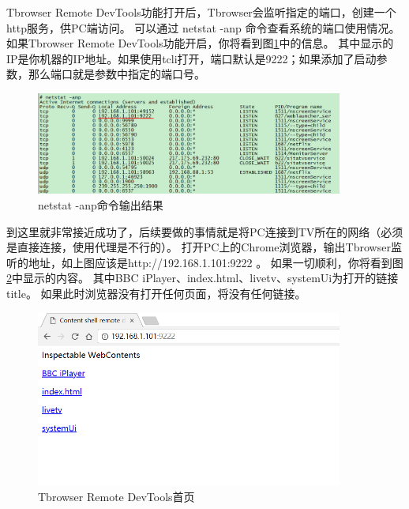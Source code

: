 Tbrowser Remote DevTools功能打开后，Tbrowser会监听指定的端口，创建一个http服务，供PC端访问。
可以通过 netstat -anp 命令查看系统的端口使用情况。
如果Tbrowser Remote DevTools功能开启，你将看到图\ref{fig:netstat_command}中的信息。
其中显示的IP是你机器的IP地址。如果使用tcli打开，端口默认是9222；如果添加了启动参数，那么端口就是参数中指定的端口号。
\begin{figure}[H] 
\centering 
\includegraphics[width=0.9\textwidth]{image/devtools_study/netstat.PNG} 
\caption{netstat -anp命令输出结果} \label{fig:netstat_command} 
\end{figure}

到这里就非常接近成功了，后续要做的事情就是将PC连接到TV所在的网络（必须是直接连接，使用代理是不行的）。
打开PC上的Chrome浏览器，输出Tbrowser监听的地址，如上图应该是http://192.168.1.101:9222 。
如果一切顺利，你将看到图\ref{fig:home_page}中显示的内容。
其中BBC iPlayer、index.html、livetv、systemUi为打开的链接title。
如果此时浏览器没有打开任何页面，将没有任何链接。
\begin{figure}[H] 
\centering 
\includegraphics[width=0.9\textwidth]{image/devtools_study/home.PNG} 
\caption{Tbrowser Remote DevTools首页} \label{fig:home_page} 
\end{figure}

